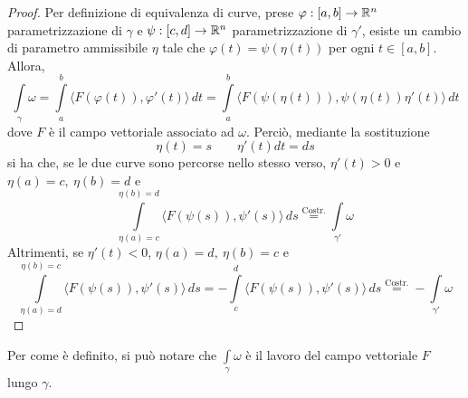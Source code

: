 \begin{proof}
    Per definizione di equivalenza di curve, prese 
    $\varphi: [a, b] \to \mathbb{R}^n$ parametrizzazione di $\gamma$ e $\psi:[c,d] \to \mathbb{R}^n$ parametrizzazione di $\gamma'$,  esiste un cambio di parametro ammissibile $\eta$ tale che $\varphi(t)= \psi(\eta(t))$ per ogni $t \in [a,b]$. Allora, 
    \begin{equation}
        \int\limits_\gamma {\omega}= \int\limits_{a}^{b}{\langle F(\varphi(t)), \varphi'(t) \rangle}\, dt = \int\limits_{a}^{b}{ \langle F(\psi(\eta(t))), \psi(\eta(t))\eta'(t)\rangle}\, dt
    \end{equation}
    dove $F$ è il campo vettoriale associato ad $\omega$.
    Perciò, mediante la sostituzione
    \begin{equation}
        \eta(t)=s \qquad \eta'(t)dt =ds
    \end{equation}
    si ha che, se le due curve sono percorse nello stesso verso, $\eta'(t) >0 $ e $\eta(a)=c,\ \eta(b)=d$ e
    \begin{equation}
    \int\limits_{\eta(a)=c}^{\eta(b)=d}{ \langle F(\psi(s)), \psi'(s)\rangle}\, ds \overset{\text{Costr.}}{=} \int\limits_{\gamma'}{\omega} 
    \end{equation}
    Altrimenti, se $\eta'(t) < 0 $,  $\eta(a)=d,\ \eta(b)=c$ e 
    \begin{equation}
     \int\limits_{\eta(a)=d}^{\eta(b)=c}{ \langle F(\psi(s)), \psi'(s)\rangle}\, ds = - \int\limits_{c}^{d}{\langle F(\psi(s)), \psi'(s)\rangle}\, ds\overset{\text{Costr.}}{=} -\int\limits_{\gamma'}{\omega} 
    \end{equation}
\end{proof}
\begin{oss}
    Per come è definito, si può notare che $\int\limits_{\gamma}{\omega}$ è il lavoro del campo vettoriale $F$ lungo $\gamma$.
\end{oss}
